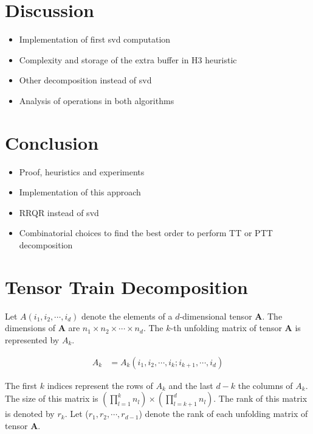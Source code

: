 \documentclass[runningheads]{llncs}
\newcommand{\tensor}[1]{\cal\textbf{#1}\xspace}
\begin{document}
\section{Discussion}
\label{sec:discussion}
\begin{itemize}
	\item Implementation of first svd computation
	\item Complexity and storage of the extra buffer in H3 heuristic
	\item Other decomposition instead of svd
	\item Analysis of operations in both algorithms
\end{itemize}
\section{Conclusion}
\label{sec:conclusion}
\begin{itemize}
	\item Proof, heuristics and experiments
	\item Implementation of this approach
	\item RRQR instead of svd
	\item Combinatorial choices to find the best order to perform TT or PTT decomposition
\end{itemize}




%
\section{Tensor Train Decomposition}
\label{sec:tt_sequential}

Let $A(i_1,i_2,\cdots, i_d)$ denote the elements of a $d$-dimensional tensor \tensor{A}. The dimensions of \tensor{A} are $n_1 \times n_2 \times \cdots \times n_d$. The $k$-th unfolding matrix of tensor \tensor{A} is represented by $A_k$.

\begin{align*}
A_k &= A_k(i_1, i_2,\cdots, i_k; i_{k+1},\cdots ,i_d)
\end{align*}

\noindent The first $k$ indices represent the rows of $A_k$ and the last $d-k$ the columns of $A_k$. The size of this matrix is $(\prod_{l=1}^{k}n_l)\times(\prod_{l=k+1}^{d}n_l)$. The rank of this matrix is denoted by $r_k$. Let ($r_1, r_2,\cdots, r_{d-1}$)  denote the rank of each unfolding matrix of tensor \tensor{A}.

\end{document}
